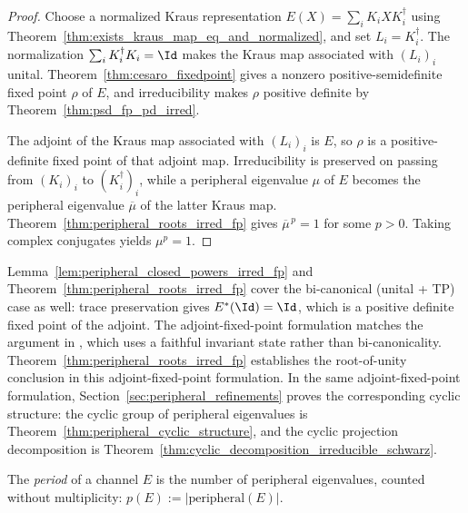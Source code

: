 \begin{proof}\leanok
    Choose a normalized Kraus representation
    $E(X)=\sum_iK_iXK_i^\dagger$ using
    Theorem~\ref{thm:exists_kraus_map_eq_and_normalized}, and set
    $L_i=K_i^\dagger$. The normalization
    $\sum_iK_i^\dagger K_i=\Id$ makes the Kraus map associated with $(L_i)_i$
    unital. Theorem~\ref{thm:cesaro_fixedpoint} gives a nonzero
    positive-semidefinite fixed point $\rho$ of $E$, and irreducibility makes
    $\rho$ positive definite by Theorem~\ref{thm:psd_fp_pd_irred}.

    The adjoint of the Kraus map associated with $(L_i)_i$ is $E$, so $\rho$
    is a positive-definite fixed point of that adjoint map. Irreducibility is
    preserved on passing from $(K_i)_i$ to $(K_i^\dagger)_i$, while a peripheral
    eigenvalue $\mu$ of $E$ becomes the peripheral eigenvalue $\overline\mu$ of
    the latter Kraus map. Theorem~\ref{thm:peripheral_roots_irred_fp} gives
    $\overline\mu^{\,p}=1$ for some $p>0$. Taking complex conjugates yields
    $\mu^p=1$.
\end{proof}

\begin{remark}\label{rem:adjoint_fp_more_general}\leanok
    Lemma~\ref{lem:peripheral_closed_powers_irred_fp}
    and Theorem~\ref{thm:peripheral_roots_irred_fp}
    cover the bi-canonical (unital + TP) case as well:
    trace preservation gives
    $E^*(\Id)=\Id$, which is a positive definite fixed
    point of the adjoint.
    The adjoint-fixed-point formulation matches the
    argument in \cite[Appendix~A]{Cirac2016MPDO_arXiv},
    which uses a faithful invariant state rather than
    bi-canonicality.
    Theorem~\ref{thm:peripheral_roots_irred_fp} establishes the
    root-of-unity conclusion in this adjoint-fixed-point formulation.
    In the same adjoint-fixed-point formulation,
    Section~\ref{sec:peripheral_refinements} proves the corresponding cyclic
    structure: the cyclic group of peripheral eigenvalues is
    Theorem~\ref{thm:peripheral_cyclic_structure}, and the cyclic projection
    decomposition is
    Theorem~\ref{thm:cyclic_decomposition_irreducible_schwarz}.
\end{remark}

\begin{definition}\label{def:channel_period}
    \leanok
    The \emph{period} of a channel $E$ is the number of
    peripheral eigenvalues, counted without multiplicity:
    $p(E):=|\mathrm{peripheral}(E)|$.
\end{definition}

